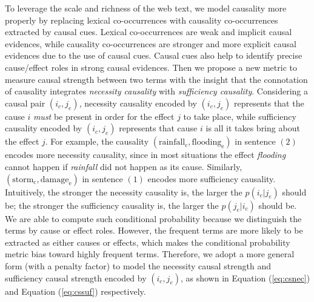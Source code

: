 \documentclass[letterpaper]{article}
\newcommand{\eqnref}[1]{Equation (\ref{#1})}
\begin{document}
To leverage the scale and richness of the web text,
we model causality more properly by replacing lexical co-occurrences with
causality co-occurrences extracted by causal cues.
Lexical co-occurrences are weak and implicit causal evidences,
while causality co-occurrences are stronger and more explicit causal
evidences due to the use of causal cues.
Causal cues also help to identify precise cause/effect roles in
strong causal evidences.
Then we propose a new metric to measure causal strength between
two terms with the insight that the connotation of causality
integrates \emph{necessity causality}
with \emph{sufficiency causality}.
Considering a causal pair $(i_c,j_e)$,
necessity causality encoded by $(i_c, j_e)$ represents
that the cause $i$ {\em must} be present in order for
the effect $j$ to take place,
while sufficiency causality encoded by $(i_c, j_e)$ represents
that cause $i$ is all it takes bring about the effect $j$.
For example, the causality $(\text{rainfall}_{\text{c}}, \text{flooding}_{\text{e}})$
in sentence $(2)$  encodes more necessity causality,
since in most situations the effect \textit{flooding} cannot happen
if \textit{rainfall} did not happen as its cause.
Similarly, $(\text{storm}_{\text{c}}, \text{damage}_{\text{e}})$ in
sentence $(1)$ encodes more sufficiency causality.
Intuitively, the stronger the necessity causality is, the larger
the $p(i_c|j_e)$ should be;
the stronger the sufficiency causality is, the larger
the $p(j_e|i_c)$ should be.
We are able to compute such conditional probability because we distinguish
the terms by cause or effect roles. However, the frequent terms are
more likely to be extracted as either causes or effects,
which makes the conditional probability metric bias toward
highly frequent terms.
Therefore, we adopt a more general form (with a penalty factor)
to model the necessity causal strength and
sufficiency causal strength encoded by $(i_c,j_e)$,
as shown in \eqnref{eq:csnec} and \eqnref{eq:cssuf} respectively.
\end{document}
